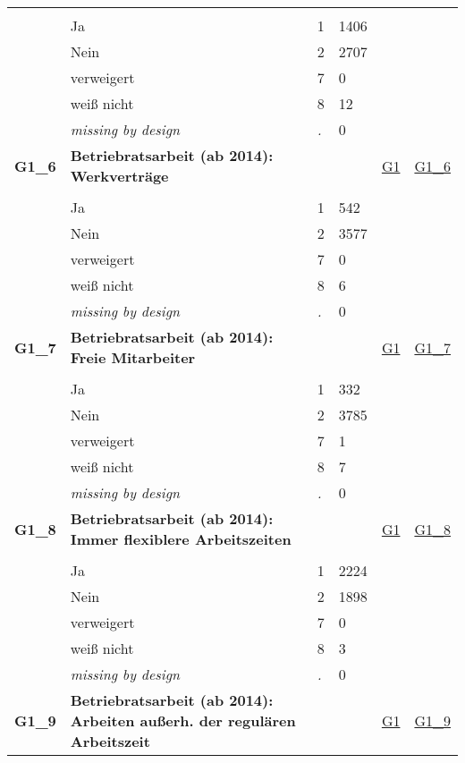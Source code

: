 \begin{longtable}{| L{2.45cm} | L{6cm} | C{1.5cm} | R{1cm} | C{2.25cm} | C{2.25cm} |}
   &  &  &  &  &  \\ 
   & Ja & 1 & 1406 &  &  \\ 
   & Nein & 2 & 2707 &  &  \\ 
   & verweigert & 7 & 0 &  &  \\ 
   & weiß nicht & 8 & 12 &  &  \\ 
   & \textit{missing by design} & \textit{.} & 0 &  &  \\ 
   \midrule
\textbf{G1\_6}\label{var:G1:6} & \textbf{Betriebratsarbeit (ab 2014): Werkverträge} &  &  & \hyperref[G1]{G1} & \hyperref[var:suf:G1:6]{G1\_6} \\ 
   &  &  &  &  &  \\ 
   & Ja & 1 & 542 &  &  \\ 
   & Nein & 2 & 3577 &  &  \\ 
   & verweigert & 7 & 0 &  &  \\ 
   & weiß nicht & 8 & 6 &  &  \\ 
   & \textit{missing by design} & \textit{.} & 0 &  &  \\ 
   \midrule
\textbf{G1\_7}\label{var:G1:7} & \textbf{Betriebratsarbeit (ab 2014): Freie Mitarbeiter} &  &  & \hyperref[G1]{G1} & \hyperref[var:suf:G1:7]{G1\_7} \\ 
   &  &  &  &  &  \\ 
   & Ja & 1 & 332 &  &  \\ 
   & Nein & 2 & 3785 &  &  \\ 
   & verweigert & 7 & 1 &  &  \\ 
   & weiß nicht & 8 & 7 &  &  \\ 
   & \textit{missing by design} & \textit{.} & 0 &  &  \\ 
   \midrule
\textbf{G1\_8}\label{var:G1:8} & \textbf{Betriebratsarbeit (ab 2014): Immer flexiblere Arbeitszeiten} &  &  & \hyperref[G1]{G1} & \hyperref[var:suf:G1:8]{G1\_8} \\ 
   &  &  &  &  &  \\ 
   & Ja & 1 & 2224 &  &  \\ 
   & Nein & 2 & 1898 &  &  \\ 
   & verweigert & 7 & 0 &  &  \\ 
   & weiß nicht & 8 & 3 &  &  \\ 
   & \textit{missing by design} & \textit{.} & 0 &  &  \\ 
   \midrule
\textbf{G1\_9}\label{var:G1:9} & \textbf{Betriebratsarbeit (ab 2014): Arbeiten außerh. der regulären Arbeitszeit} &  &  & \hyperref[G1]{G1} & \hyperref[var:suf:G1:9]{G1\_9} \\ 

\end{longtable}
